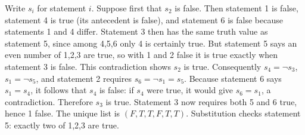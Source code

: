 Write $s_i$ for statement $i$. Suppose first that $s_2$ is false. Then statement 1 is false, statement 4 is true (its antecedent is false), and statement 6 is false because statements 1 and 4 differ. Statement 3 then has the same truth value as statement 5, since among 4,5,6 only 4 is certainly true. But statement 5 says an even number of 1,2,3 are true, so with 1 and 2 false it is true exactly when statement 3 is false. This contradiction shows $s_2$ is true. Consequently $s_4=\neg s_3$, $s_1=\neg s_5$, and statement 2 requires $s_6=\neg s_1=s_5$. Because statement 6 says $s_1=s_4$, it follows that $s_4$ is false: if $s_4$ were true, it would give $s_6=s_1$, a contradiction. Therefore $s_3$ is true. Statement 3 now requires both 5 and 6 true, hence 1 false. The unique list is $\boxed{(F,T,T,F,T,T)}$. Substitution checks statement 5: exactly two of 1,2,3 are true.
